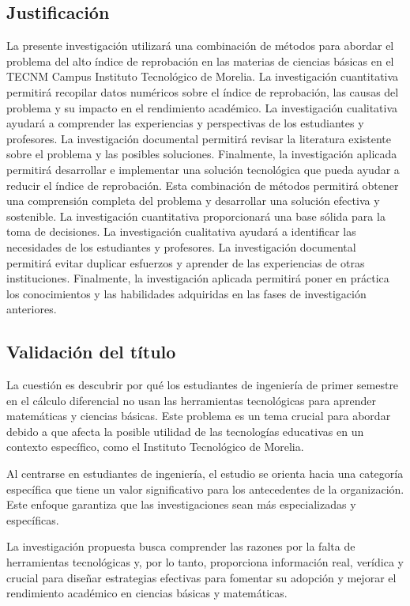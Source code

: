 \documentclass{article}
\begin{document}
\subsection{Justificación}

La presente investigación utilizará una combinación de métodos para abordar el problema del alto índice de reprobación en las materias de ciencias básicas en el TECNM Campus Instituto Tecnológico de Morelia.
La investigación cuantitativa permitirá recopilar datos numéricos sobre el índice de reprobación, las causas del problema y su impacto en el rendimiento académico. La investigación cualitativa ayudará a comprender las experiencias y perspectivas de los estudiantes y profesores. La investigación documental permitirá revisar la literatura existente sobre el problema y las posibles soluciones. Finalmente, la investigación aplicada permitirá desarrollar e implementar una solución tecnológica que pueda ayudar a reducir el índice de reprobación.
Esta combinación de métodos permitirá obtener una comprensión completa del problema y desarrollar una solución efectiva y sostenible. La investigación cuantitativa proporcionará una base sólida para la toma de decisiones. La investigación cualitativa ayudará a identificar las necesidades de los estudiantes y profesores. La investigación documental permitirá evitar duplicar esfuerzos
  y aprender de las experiencias de otras instituciones. Finalmente, la investigación aplicada permitirá poner en práctica los conocimientos y las habilidades adquiridas en las fases de investigación anteriores.

\subsection{Validación del título}

La cuestión es descubrir por qué los estudiantes de ingeniería de primer semestre en el cálculo diferencial no usan las herramientas tecnológicas para aprender matemáticas y ciencias básicas. Este problema es un tema crucial para abordar debido a que afecta la posible utilidad de las tecnologías educativas en un contexto específico, como el Instituto Tecnológico de Morelia.
 
Al centrarse en estudiantes de ingeniería, el estudio se orienta hacia una categoría específica que tiene un valor significativo para los antecedentes de la organización. Este enfoque garantiza que las investigaciones sean más especializadas y específicas.
 
La investigación propuesta busca comprender las razones por la falta de herramientas tecnológicas y, por lo tanto, proporciona información real, verídica y crucial para diseñar estrategias efectivas para fomentar su adopción y mejorar el rendimiento académico en ciencias básicas y matemáticas.
\end{document}
